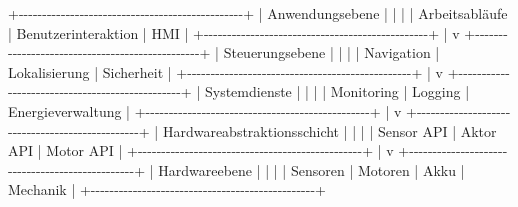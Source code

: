 \documentclass[
]{article}
\newenvironment{Shaded}{}{}
\newcommand{\NormalTok}[1]{#1}
\begin{document}
\begin{Shaded}
\begin{Highlighting}[]
\NormalTok{+{-}{-}{-}{-}{-}{-}{-}{-}{-}{-}{-}{-}{-}{-}{-}{-}{-}{-}{-}{-}{-}{-}{-}{-}{-}{-}{-}{-}{-}{-}{-}{-}{-}{-}{-}{-}{-}{-}{-}{-}{-}{-}{-}{-}{-}{-}{-}{-}+}
\NormalTok{|                Anwendungsebene                 |}
\NormalTok{|                                                |}
\NormalTok{|  Arbeitsabläufe | Benutzerinteraktion | HMI     |}
\NormalTok{+{-}{-}{-}{-}{-}{-}{-}{-}{-}{-}{-}{-}{-}{-}{-}{-}{-}{-}{-}{-}{-}{-}{-}{-}{-}{-}{-}{-}{-}{-}{-}{-}{-}{-}{-}{-}{-}{-}{-}{-}{-}{-}{-}{-}{-}{-}{-}{-}+}
\NormalTok{                     |}
\NormalTok{                     v}
\NormalTok{+{-}{-}{-}{-}{-}{-}{-}{-}{-}{-}{-}{-}{-}{-}{-}{-}{-}{-}{-}{-}{-}{-}{-}{-}{-}{-}{-}{-}{-}{-}{-}{-}{-}{-}{-}{-}{-}{-}{-}{-}{-}{-}{-}{-}{-}{-}{-}{-}+}
\NormalTok{|              Steuerungsebene                   |}
\NormalTok{|                                                |}
\NormalTok{| Navigation | Lokalisierung | Sicherheit        |}
\NormalTok{+{-}{-}{-}{-}{-}{-}{-}{-}{-}{-}{-}{-}{-}{-}{-}{-}{-}{-}{-}{-}{-}{-}{-}{-}{-}{-}{-}{-}{-}{-}{-}{-}{-}{-}{-}{-}{-}{-}{-}{-}{-}{-}{-}{-}{-}{-}{-}{-}+}
\NormalTok{                     |}
\NormalTok{                     v}
\NormalTok{+{-}{-}{-}{-}{-}{-}{-}{-}{-}{-}{-}{-}{-}{-}{-}{-}{-}{-}{-}{-}{-}{-}{-}{-}{-}{-}{-}{-}{-}{-}{-}{-}{-}{-}{-}{-}{-}{-}{-}{-}{-}{-}{-}{-}{-}{-}{-}{-}+}
\NormalTok{|             Systemdienste                      |}
\NormalTok{|                                                |}
\NormalTok{| Monitoring | Logging | Energieverwaltung       |}
\NormalTok{+{-}{-}{-}{-}{-}{-}{-}{-}{-}{-}{-}{-}{-}{-}{-}{-}{-}{-}{-}{-}{-}{-}{-}{-}{-}{-}{-}{-}{-}{-}{-}{-}{-}{-}{-}{-}{-}{-}{-}{-}{-}{-}{-}{-}{-}{-}{-}{-}+}
\NormalTok{                     |}
\NormalTok{                     v}
\NormalTok{+{-}{-}{-}{-}{-}{-}{-}{-}{-}{-}{-}{-}{-}{-}{-}{-}{-}{-}{-}{-}{-}{-}{-}{-}{-}{-}{-}{-}{-}{-}{-}{-}{-}{-}{-}{-}{-}{-}{-}{-}{-}{-}{-}{-}{-}{-}{-}{-}+}
\NormalTok{|        Hardwareabstraktionsschicht             |}
\NormalTok{|                                                |}
\NormalTok{| Sensor API | Aktor API | Motor API             |}
\NormalTok{+{-}{-}{-}{-}{-}{-}{-}{-}{-}{-}{-}{-}{-}{-}{-}{-}{-}{-}{-}{-}{-}{-}{-}{-}{-}{-}{-}{-}{-}{-}{-}{-}{-}{-}{-}{-}{-}{-}{-}{-}{-}{-}{-}{-}{-}{-}{-}{-}+}
\NormalTok{                     |}
\NormalTok{                     v}
\NormalTok{+{-}{-}{-}{-}{-}{-}{-}{-}{-}{-}{-}{-}{-}{-}{-}{-}{-}{-}{-}{-}{-}{-}{-}{-}{-}{-}{-}{-}{-}{-}{-}{-}{-}{-}{-}{-}{-}{-}{-}{-}{-}{-}{-}{-}{-}{-}{-}{-}+}
\NormalTok{|                Hardwareebene                   |}
\NormalTok{|                                                |}
\NormalTok{| Sensoren | Motoren | Akku | Mechanik           |}
\NormalTok{+{-}{-}{-}{-}{-}{-}{-}{-}{-}{-}{-}{-}{-}{-}{-}{-}{-}{-}{-}{-}{-}{-}{-}{-}{-}{-}{-}{-}{-}{-}{-}{-}{-}{-}{-}{-}{-}{-}{-}{-}{-}{-}{-}{-}{-}{-}{-}{-}+}
\end{Highlighting}
\end{Shaded}
\end{document}
